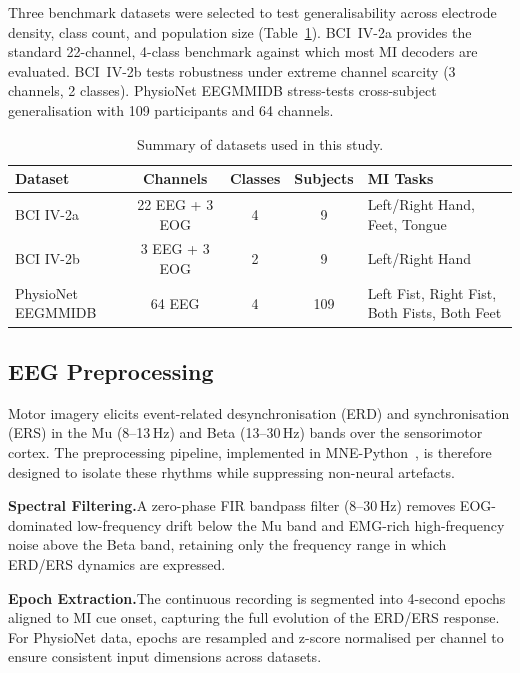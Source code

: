\documentclass[12pt, a4paper]{article}
\begin{document}
Three benchmark datasets were selected to test generalisability across electrode density, class count, and population size (Table~\ref{tab:datasets}). BCI~IV-2a provides the standard 22-channel, 4-class benchmark against which most MI decoders are evaluated. BCI~IV-2b tests robustness under extreme channel scarcity (3 channels, 2 classes). PhysioNet EEGMMIDB stress-tests cross-subject generalisation with 109 participants and 64 channels.

\begin{table}[htbp]
\centering
\caption{Summary of datasets used in this study.}
\label{tab:datasets}
\begin{tabular}{@{} l c c c >{\raggedright\arraybackslash}p{6cm} @{}}
\toprule
\textbf{Dataset} & \textbf{Channels} & \textbf{Classes} & \textbf{Subjects} & \textbf{MI Tasks} \\
\midrule
BCI IV-2a & 22 EEG + 3 EOG & 4 & 9 & Left/Right Hand, Feet, Tongue \\
BCI IV-2b & 3 EEG + 3 EOG & 2 & 9 & Left/Right Hand \\
PhysioNet EEGMMIDB & 64 EEG & 4 & 109 & Left Fist, Right Fist, Both Fists, Both Feet \\
\bottomrule
\end{tabular}
\end{table}

\subsection{EEG Preprocessing}

Motor imagery elicits event-related desynchronisation (ERD) and synchronisation (ERS) in the Mu (8--13\,Hz) and Beta (13--30\,Hz) bands over the sensorimotor cortex. The preprocessing pipeline, implemented in MNE-Python~\cite{gramfort2013mne}, is therefore designed to isolate these rhythms while suppressing non-neural artefacts.

\textbf{Spectral Filtering.}\quad A zero-phase FIR bandpass filter (8--30\,Hz) removes EOG-dominated low-frequency drift below the Mu band and EMG-rich high-frequency noise above the Beta band, retaining only the frequency range in which ERD/ERS dynamics are expressed.

\textbf{Epoch Extraction.}\quad The continuous recording is segmented into 4-second epochs aligned to MI cue onset, capturing the full evolution of the ERD/ERS response. For PhysioNet data, epochs are resampled and z-score normalised per channel to ensure consistent input dimensions across datasets.
\end{document}
